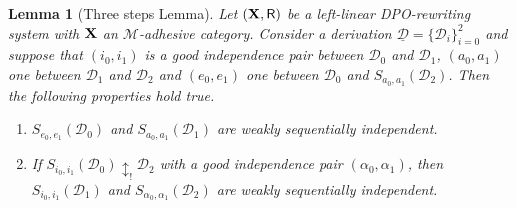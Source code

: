 \documentclass[a4paper]{article}
\def\R{\mathsf{R}}
\def\X{\textbf {\textup{X}}}
\newcommand{\dder}[1]{\mathscr{#1}}
\newcommand{\der}[1]{\underline{\dder{#1}}}
\newtheorem{lemma}[theorem]{Lemma}
\theoremstyle{definition}
\begin{document}
\begin{lemma}[Three steps Lemma]\label{lem:iig1}Let $(\X,\R)$ be a left-linear DPO-rewriting system with $\X$ an $\mathcal{M}$-adhesive category. Consider a derivation $\der{D}=\{\dder{D}_i\}_{i=0}^2$ and suppose that $(i_0,i_1)$ is a good independence pair between $\dder{D}_0$ and $\dder{D}_1$, $(a_0,a_1)$ one between $\dder{D}_1$ and $\dder{D}_2$ and $(e_0, e_1)$ one between $\dder{D}_0$ and $S_{a_0,a_1}(\dder{D}_2)$. Then the following properties hold true.
	\begin{enumerate}
		\item $S_{e_0,e_1}(\dder{D}_0)$ and $S_{a_0,a_1}(\dder{D}_1)$ are weakly sequentially independent.
		\item If $S_{i_0, i_1}(\dder{D}_0)\updownarrow_! \dder{D}_2$ with a good independence pair $(\alpha_0, \alpha_1)$, then  $S_{i_0,i_1}(\dder{D}_1)$ and $S_{\alpha_0, \alpha_1}(\dder{D}_2)$ are weakly sequentially independent.
	\end{enumerate}
	
\end{lemma}
\end{document}
